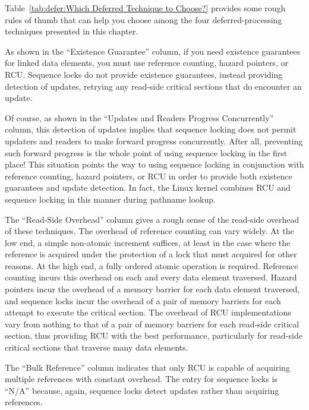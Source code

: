 Table~\ref{tab:defer:Which Deferred Technique to Choose?}
provides some rough rules of thumb that can help you choose among the
four deferred-processing techniques presented in this chapter.

As shown in the ``Existence Guarantee'' column,
if you need existence guarantees for linked
data elements, you must use reference counting, hazard pointers, or RCU.
Sequence locks do not provide existence guarantees, instead providing
detection of updates, retrying any read-side critical sections
that do encounter an update.

Of course, as shown in the ``Updates and Readers Progress Concurrently''
column, this detection of updates implies
that sequence locking does not permit updaters and readers to make forward
progress concurrently.
After all, preventing such forward progress is the whole point of using
sequence locking in the first place!
This situation points the way to using sequence locking in conjunction
with reference counting, hazard pointers, or RCU in order to provide
both existence guarantees and update detection.
In fact, the Linux kernel combines RCU and sequence locking in
this manner during pathname lookup.

The ``Read-Side Overhead'' column gives a rough sense of the read-side
overhead of these techniques.
The overhead of reference counting can vary widely.
At the low end, a simple non-atomic increment suffices, at least in the
case where the reference is acquired under the protection of a lock
that must acquired for other reasons.
At the high end, a fully ordered atomic operation is required.
Reference counting incurs this overhead on each and every data element
traversed.
Hazard pointers incur the overhead of a memory barrier for each data element
traversed, and sequence locks incur the overhead of a pair of memory barriers
for each attempt to execute the critical section.
The overhead of RCU implementations vary from nothing to that of a pair of
memory barriers for each read-side critical section, thus providing RCU
with the best performance, particularly for read-side critical sections
that traverse many data elements.

The ``Bulk Reference'' column indicates that only RCU is capable of acquiring
multiple references with constant overhead.
The entry for sequence locks is ``N/A'' because, again, sequence locks
detect updates rather than acquiring references.


